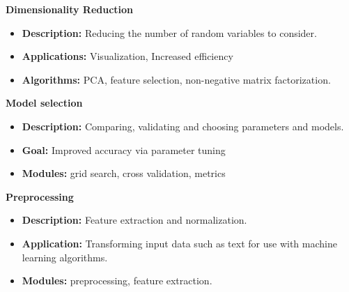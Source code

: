 \documentclass[MASTER.tex]{subfiles}
\begin{document}
\begin{frame}
	\LARGE
\textbf{Dimensionality Reduction}\\

\begin{itemize}
	\item \textbf{Description: } Reducing the number of random variables to consider.
\item \textbf{Applications:} Visualization, Increased efficiency
\item \textbf{Algorithms:} PCA, feature selection, non-negative matrix factorization. 
\end{itemize}
\end{frame}
\begin{frame}
\LARGE
\textbf{Model selection}\\
\begin{itemize}
	\item \textbf{Description: } Comparing, validating and choosing parameters and models.
\item \textbf{Goal:} Improved accuracy via parameter tuning
\item \textbf{Modules:} grid search, cross validation, metrics
\end{itemize}
\end{frame}
\begin{frame}
\LARGE
\textbf{Preprocessing}\\
\begin{itemize}
\item \textbf{Description:} Feature extraction and normalization.
\item \textbf{Application:} Transforming input data such as text for use with machine learning algorithms.
\item \textbf{Modules:} preprocessing, feature extraction.
\end{itemize}
\end{frame}
\end{document}
